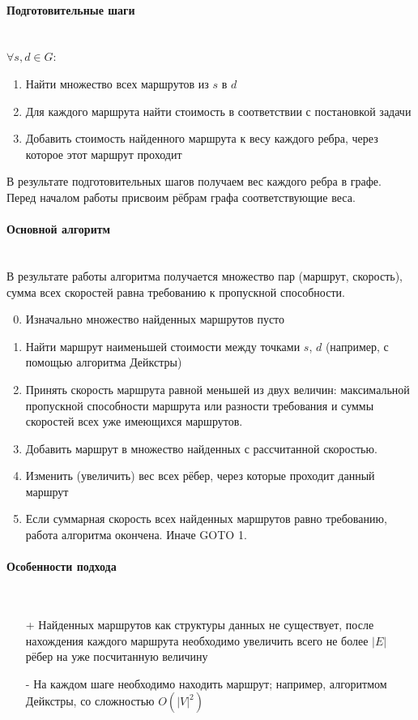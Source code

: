 \documentclass[a4paper]{article}
\begin{document}
\paragraph{Подготовительные шаги}\mbox{}\\
$\forall s, d \in G: $
\begin{enumerate}
\item Найти множество всех маршрутов из $s$ в $d$
\item Для каждого маршрута найти стоимость в соответствии с постановкой задачи
\item Добавить стоимость найденного маршрута к весу каждого ребра, через которое этот маршрут проходит
\end{enumerate}
В результате подготовительных шагов получаем вес каждого ребра в графе. Перед началом работы присвоим рёбрам графа соответствующие веса.

\paragraph{Основной алгоритм}\mbox{}\\
В результате работы алгоритма получается множество пар (маршрут, скорость), сумма всех скоростей равна требованию к пропускной способности.
\begin{enumerate}
\setcounter{enumi}{-1}
\item Изначально множество найденных маршрутов пусто
\item Найти маршрут наименьшей стоимости между точками $s$, $d$ (например, с помощью алгоритма Дейкстры) 
\item Принять скорость маршрута равной меньшей из двух величин: максимальной пропускной способности маршрута или разности требования и суммы скоростей всех уже имеющихся маршрутов.
\item Добавить маршрут в множество найденных с рассчитанной скоростью. 
\item Изменить (увеличить) вес всех рёбер, через которые проходит данный маршрут
\item Если суммарная скорость всех найденных маршрутов равно требованию, работа алгоритма окончена. Иначе  GOTO 1.
\end{enumerate}

\paragraph{Особенности подхода}\mbox{}\\
\begin{itemize}
\item[+] Найденных маршрутов как структуры данных не существует, после нахождения каждого маршрута необходимо увеличить всего не более $|E|$ рёбер на уже посчитанную величину
\item[-] На каждом шаге необходимо находить маршрут; например, алгоритмом Дейкстры, со сложностью $O(|V|^2)$
\end{itemize}
\end{document}
